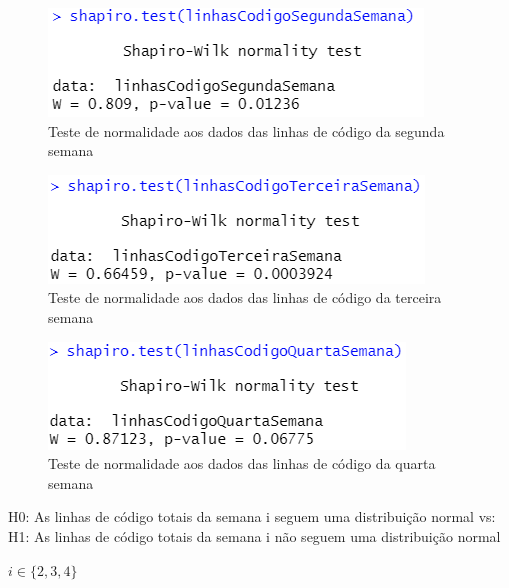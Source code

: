 \begin{figure}
    \centering
    \includegraphics[width=0.5\linewidth]{imagens//questao2/testeShapiroLinhasSegundaSemana.png}
    \caption{Teste de normalidade aos dados das linhas de código da segunda semana}
    \label{fig:shapiroTesteSemana2Linhas}
\end{figure}

\begin{figure}
    \centering
    \includegraphics[width=0.5\linewidth]{imagens//questao2/testeShapiroLinhasTerceiraSemana.png}
    \caption{Teste de normalidade aos dados das linhas de código da terceira semana}
    \label{fig:shapiroTesteSemana3Linhas}
\end{figure}

 \begin{figure}
     \centering
     \includegraphics[width=0.5\linewidth]{imagens//questao2/testeShapiroLinhasQuartaSemana.png}
     \caption{Teste de normalidade aos dados das linhas de código da quarta semana}
     \label{fig:shapiroTesteSemana4Linhas}
 \end{figure}

\begin{center}
    H0: As linhas de código totais da semana i seguem uma distribuição normal
    \newline
    vs:
    \newline
    H1: As linhas de código totais da semana i não seguem uma distribuição normal
    \newline
\end{center}
$i \in \{2, 3, 4\}$


